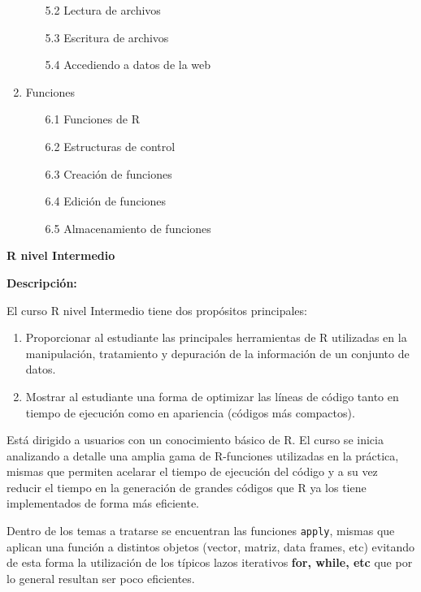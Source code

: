 \documentclass[12pt,a4paper,oneside]{article}\usepackage[]{graphicx}\usepackage[]{color}
\begin{document}
\begin{enumerate}
\begin{enumerate}
    \item[5.2] Lectura de archivos
    \item[5.3] Escritura de archivos
    \item[5.4] Accediendo a datos de la web
  \end{enumerate}
  \item {\Large Funciones}
    \begin{enumerate}
    \item[6.1] Funciones de R
    \item[6.2] Estructuras de control
    \item[6.3] Creación de funciones
    \item[6.4] Edición de funciones
    \item[6.5] Almacenamiento de funciones
  \end{enumerate}
\end{enumerate}


\newpage

\begin{center}
{\bf \Large R nivel Intermedio}
\end{center}

{\bf \large Descripción:}\newline

El curso R nivel Intermedio tiene dos propósitos principales:
\begin{enumerate}
   \item Proporcionar al estudiante las principales herramientas de R utilizadas en la manipulación,
   tratamiento y depuración de la información de un conjunto de datos.
   \item Mostrar al estudiante una forma de optimizar las líneas de código tanto en tiempo de ejecución
   como en apariencia (códigos más compactos).
\end{enumerate}

Está dirigido a usuarios con un conocimiento básico de R. El curso se inicia analizando a detalle una amplia gama de R-funciones utilizadas en la práctica, mismas que permiten acelarar el tiempo de ejecución del código y a su vez  reducir el tiempo en la generación de grandes códigos que R ya los tiene implementados de forma más eficiente.\newline

Dentro de los temas a tratarse se encuentran las funciones \texttt{apply}, mismas que aplican una función a distintos objetos (vector, matriz, data frames, etc) evitando de esta forma la utilización de los típicos lazos iterativos {\bf for, while, etc} que por lo general resultan ser poco eficientes.\newline
  
\end{document}
